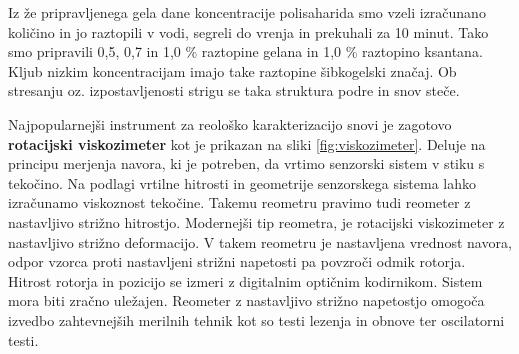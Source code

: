 \documentclass{article}
\begin{document}
Iz že pripravljenega gela dane koncentracije polisaharida smo vzeli izračunano količino in jo raztopili v vodi, segreli do vrenja in prekuhali za 10 minut. Tako smo pripravili 0,5, 0,7 in 1,0 \% raztopine gelana in 1,0 \% raztopino ksantana. Kljub nizkim koncentracijam imajo take raztopine šibkogelski značaj. Ob stresanju oz. izpostavljenosti strigu se taka struktura podre in snov steče.

Najpopularnejši instrument za reološko karakterizacijo snovi je zagotovo \textbf{rotacijski viskozimeter} kot je prikazan na sliki \ref{fig:viskozimeter}. Deluje na principu merjenja navora, ki je potreben, da vrtimo senzorski sistem v stiku s tekočino. Na podlagi vrtilne hitrosti in geometrije senzorskega sistema lahko izračunamo viskoznost tekočine. Takemu reometru pravimo tudi reometer z nastavljivo strižno hitrostjo. Modernejši tip reometra, je rotacijski viskozimeter z nastavljivo strižno deformacijo. V takem reometru je nastavljena vrednost navora, odpor vzorca proti nastavljeni strižni napetosti pa povzroči odmik rotorja. Hitrost rotorja in pozicijo se izmeri z digitalnim optičnim kodirnikom. Sistem mora biti zračno uležajen. Reometer z nastavljivo strižno napetostjo omogoča izvedbo zahtevnejših merilnih tehnik kot so testi lezenja in obnove ter oscilatorni testi.
\end{document}
